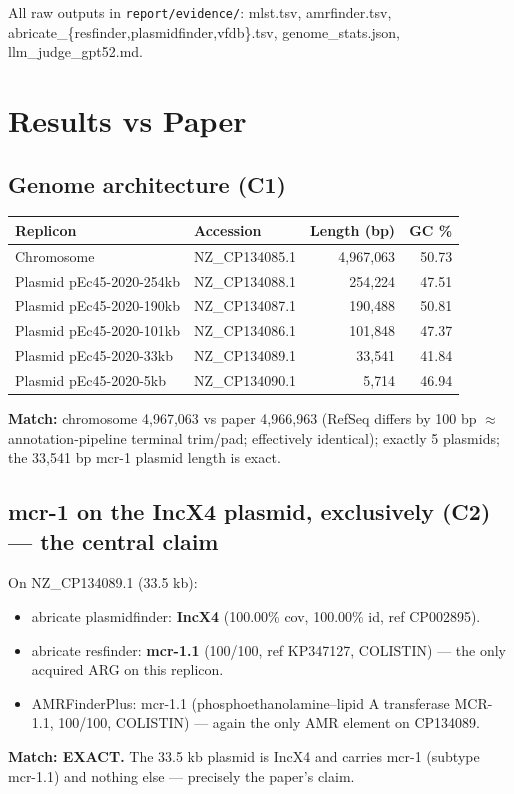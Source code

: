 \documentclass[11pt,letterpaper]{article}
\begin{document}
All raw outputs in \texttt{report/evidence/}: mlst.tsv, amrfinder.tsv,
abricate\_\{resfinder,plasmidfinder,vfdb\}.tsv, genome\_stats.json,
llm\_judge\_gpt52.md.

\section{Results vs Paper}

\subsection{Genome architecture (C1)}
\begin{longtable}{@{}llrr@{}}
\toprule
Replicon & Accession & Length (bp) & GC \% \\
\midrule
Chromosome & NZ\_CP134085.1 & 4{,}967{,}063 & 50.73 \\
Plasmid pEc45-2020-254kb & NZ\_CP134088.1 & 254{,}224 & 47.51 \\
Plasmid pEc45-2020-190kb & NZ\_CP134087.1 & 190{,}488 & 50.81 \\
Plasmid pEc45-2020-101kb & NZ\_CP134086.1 & 101{,}848 & 47.37 \\
Plasmid pEc45-2020-33kb  & NZ\_CP134089.1 & 33{,}541  & 41.84 \\
Plasmid pEc45-2020-5kb   & NZ\_CP134090.1 & 5{,}714   & 46.94 \\
\bottomrule
\end{longtable}
\textbf{Match:} chromosome 4{,}967{,}063 vs paper 4{,}966{,}963 (RefSeq differs by
100 bp $\approx$ annotation-pipeline terminal trim/pad; effectively identical); exactly
5 plasmids; the 33{,}541 bp mcr-1 plasmid length is exact.

\subsection{mcr-1 on the IncX4 plasmid, exclusively (C2) --- the central claim}
On NZ\_CP134089.1 (33.5 kb):
\begin{itemize}[leftmargin=1.5em]
  \item abricate plasmidfinder: \textbf{IncX4} (100.00\% cov, 100.00\% id, ref CP002895).
  \item abricate resfinder: \textbf{mcr-1.1} (100/100, ref KP347127, COLISTIN) --- the only acquired ARG on this replicon.
  \item AMRFinderPlus: mcr-1.1 (phosphoethanolamine--lipid A transferase MCR-1.1, 100/100, COLISTIN) --- again the only AMR element on CP134089.
\end{itemize}
\textbf{Match: EXACT.} The 33.5 kb plasmid is IncX4 and carries mcr-1 (subtype mcr-1.1) and
nothing else --- precisely the paper's claim.
\end{document}
